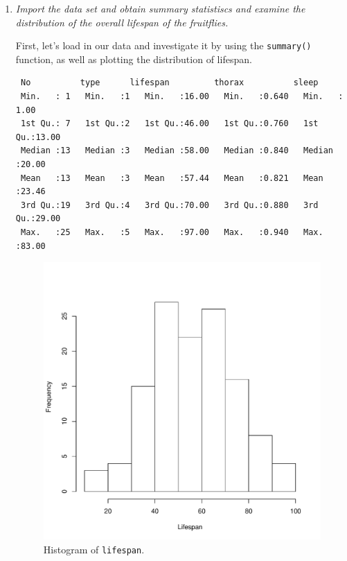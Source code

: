 \documentclass[12pt,letterpaper]{article}
\begin{document}
\begin{enumerate}[label=(\alph*)]
	
	\item \emph{Import the data set and obtain summary statistiscs and examine the distribution of the overall lifespan of the fruitflies. }
	 
	 First, let's load in our data and investigate it by using the \texttt{summary()} function, as well as plotting the distribution of lifespan.
	 
	 \vspace{.15cm}
	   
	 
		\begin{verbatim}
 No          type      lifespan         thorax          sleep      
 Min.   : 1   Min.   :1   Min.   :16.00   Min.   :0.640   Min.   : 1.00  
 1st Qu.: 7   1st Qu.:2   1st Qu.:46.00   1st Qu.:0.760   1st Qu.:13.00  
 Median :13   Median :3   Median :58.00   Median :0.840   Median :20.00  
 Mean   :13   Mean   :3   Mean   :57.44   Mean   :0.821   Mean   :23.46  
 3rd Qu.:19   3rd Qu.:4   3rd Qu.:70.00   3rd Qu.:0.880   3rd Qu.:29.00  
 Max.   :25   Max.   :5   Max.   :97.00   Max.   :0.940   Max.   :83.00  
		\end{verbatim}
		
		
		\begin{figure}[h!]\centering
			\caption{\footnotesize Histogram of \texttt{lifespan}.
			}\vspace{-1cm}
			\label{fig:plot3_a}
			\includegraphics[width=.75\textwidth]{plot3_a.pdf}
		\end{figure}
			 \vspace{.25cm}


\end{enumerate}
\end{document}
